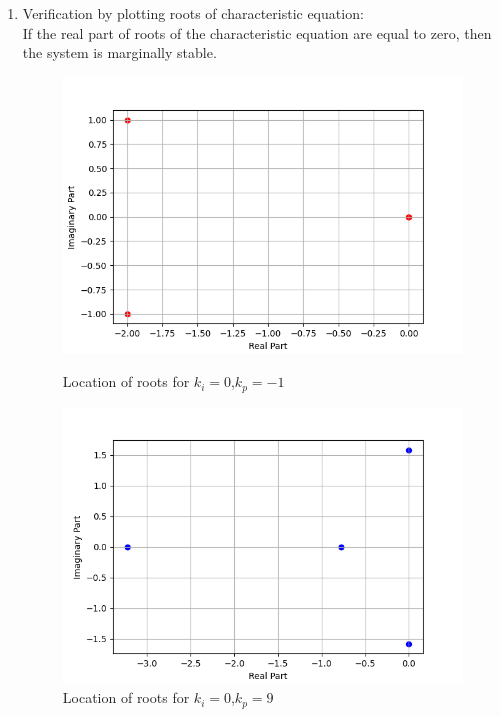 \documentclass[journal,12pt,onecolumn]{IEEEtran}
\theoremstyle{remark}
\begin{document}
    \begin{enumerate}
        \item Verification by plotting roots of characteristic equation:\\
        If the real part of roots of the characteristic equation are equal to zero, then the system is marginally stable.
\begin{figure}    
    \centering
\graphicspath{ {figs/} }
\includegraphics[width=\columnwidth]{graph_1}
\label{figure:ee25-gate4-graph1}
\caption{Location of roots for $k_i=0$,$k_p=-1$}
\end{figure}

\begin{figure}    
    \centering
\graphicspath{ {figs/} }
\includegraphics[width=\columnwidth]{graph_2}
\caption{Location of roots for $k_i=0$,$k_p=9$}
\label{figure:ee25-gate4-graph2}
\end{figure}


\end{enumerate}
\end{document}
